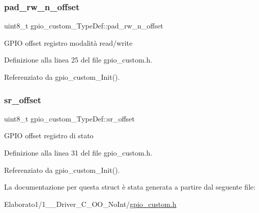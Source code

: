 \subsubsection{\texorpdfstring{pad\+\_\+rw\+\_\+n\+\_\+offset}{pad\_rw\_n\_offset}}
{\footnotesize\ttfamily uint8\+\_\+t gpio\+\_\+custom\+\_\+\+Type\+Def\+::pad\+\_\+rw\+\_\+n\+\_\+offset}

G\+P\+IO offset registro modalità read/write 

Definizione alla linea 25 del file gpio\+\_\+custom.\+h.



Referenziato da gpio\+\_\+custom\+\_\+\+Init().

\mbox{\label{structgpio__custom___type_def_afd636112e1d82c5c047672f6822c4791}} 
\subsubsection{\texorpdfstring{sr\+\_\+offset}{sr\_offset}}
{\footnotesize\ttfamily uint8\+\_\+t gpio\+\_\+custom\+\_\+\+Type\+Def\+::sr\+\_\+offset}

G\+P\+IO offset registro di stato 

Definizione alla linea 31 del file gpio\+\_\+custom.\+h.



Referenziato da gpio\+\_\+custom\+\_\+\+Init().



La documentazione per questa struct è stata generata a partire dal seguente file\+:\begin{DoxyCompactItemize}
\item 
Elaborato1/1\+\_\+\_\+\+Driver\+\_\+\+C\+\_\+\+O\+O\+\_\+\+No\+Int/\hyperlink{1__2___driver___c___o_o___no_int_2gpio__custom_8h}{gpio\+\_\+custom.\+h}\end{DoxyCompactItemize}
